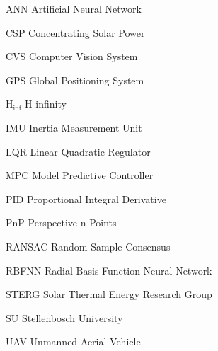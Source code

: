 \begin{Nomencl}
   \item[ANN]		\qquad Artificial Neural Network
   \item[CSP] 		\qquad Concentrating Solar Power
   \item[CVS] 		\qquad Computer Vision System
   \item[GPS] 		\qquad Global Positioning System	
   \item[H$_{\inf}$]	\qquad H-infinity 
   \item[IMU]		\qquad Inertia Measurement Unit
   \item[LQR]		\qquad Linear Quadratic Regulator
   \item[MPC]		\qquad Model Predictive Controller
   \item[PID]		\qquad Proportional Integral Derivative
   \item[PnP]		\qquad Perspective n-Points
   \item[RANSAC]	\qquad Random Sample Consensus
   \item[RBFNN]		\qquad Radial Basis Function Neural Network
   \item[STERG]		\qquad Solar Thermal Energy Research Group
   \item[SU]		\qquad Stellenbosch University
   \item[UAV]		\qquad Unmanned Aerial Vehicle

\end{Nomencl}

\endinput
